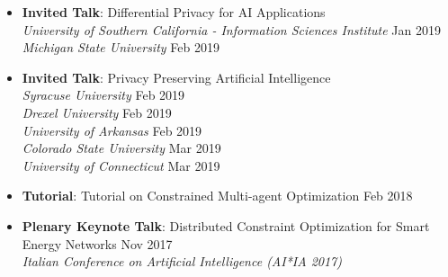 \begin{itemize}
  \item {\bf Invited Talk}: Differential Privacy for AI Applications\\
  {\em University of Southern California - Information Sciences Institute} \hfill {Jan 2019}\\
  {\em Michigan State University} \hfill {Feb 2019}

  \item {\bf Invited Talk}: Privacy Preserving Artificial Intelligence\\
  {\em Syracuse University} \hfill {Feb 2019}\\
  {\em Drexel University} \hfill {Feb 2019}\\
  {\em University of Arkansas} \hfill {Feb 2019}\\
  {\em Colorado State University} \hfill {Mar 2019}\\
  {\em University of Connecticut} \hfill {Mar 2019}






	\item {\bf Tutorial}: {Tutorial on Constrained Multi-agent Optimization} \hfill {Feb 2018}\\
  	

	\item {\bf Plenary Keynote Talk}: Distributed Constraint Optimization for Smart Energy Networks \hfill {Nov 2017}\\
    {\em Italian Conference on Artificial Intelligence (AI*IA 2017)}
	


\end{itemize}
